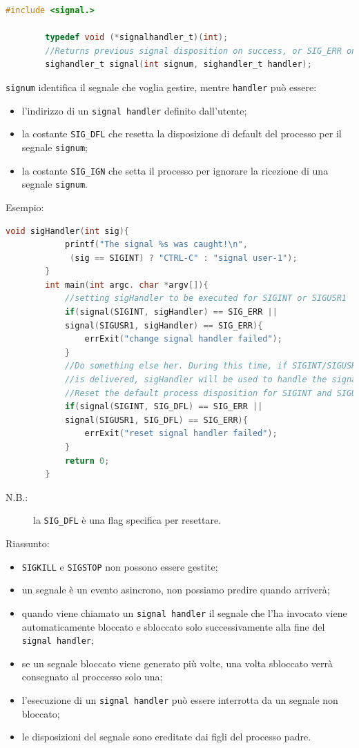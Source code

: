 \documentclass[a4paper, 12pt]{book}
\begin{document}
    \begin{lstlisting}[language=C]
        #include <signal.>

        typedef void (*signalhandler_t)(int);
        //Returns previous signal disposition on success, or SIG_ERR on error 
        sighandler_t signal(int signum, sighandler_t handler);
    \end{lstlisting}
    \verb|signum| identifica il segnale che voglia gestire, 
    mentre \verb|handler| può essere:
    \begin{itemize}
        \item l'indirizzo di un \verb|signal handler| definito dall'utente;
        \item la costante \verb|SIG_DFL| che resetta la disposizione di default del processo per il segnale \verb|signum|;
        \item la costante \verb|SIG_IGN| che setta il processo per ignorare la ricezione di una segnale \verb|signum|.
    \end{itemize}
    Esempio:
    \begin{lstlisting}[language=C]
        void sigHandler(int sig){
            printf("The signal %s was caught!\n",
             (sig == SIGINT) ? "CTRL-C" : "signal user-1");
        }
        int main(int argc. char *argv[]){
            //setting sigHandler to be executed for SIGINT or SIGUSR1
            if(signal(SIGINT, sigHandler) == SIG_ERR ||
            signal(SIGUSR1, sigHandler) == SIG_ERR){
                errExit("change signal handler failed");
            }
            //Do something else her. During this time, if SIGINT/SIGUSR1
            //is delivered, sigHandler will be used to handle the signal.
            //Reset the default process disposition for SIGINT and SIGUSR1
            if(signal(SIGINT, SIG_DFL) == SIG_ERR || 
            signal(SIGUSR1, SIG_DFL) == SIG_ERR){
                errExit("reset signal handler failed");
            }
            return 0;
        }
    \end{lstlisting}
    \begin{description}
        \item[N.B.:] la \verb|SIG_DFL| è una flag specifica per resettare.
    \end{description}
    Riassunto:
    \begin{itemize}
        \item \verb|SIGKILL| e \verb|SIGSTOP| non possono essere gestite;
        \item un segnale è un evento asincrono, non possiamo predire quando arriverà;
        \item quando viene chiamato un \verb|signal handler| il segnale che l'ha invocato viene automaticamente bloccato e sbloccato solo successivamente alla fine del \verb|signal handler|;
        \item se un segnale bloccato viene generato più volte, una volta sbloccato verrà consegnato al proccesso solo una;
        \item l'esecuzione di un \verb|signal handler| può essere interrotta da un segnale non bloccato;
        \item le disposizioni del segnale sono ereditate dai figli del processo padre.
    \end{itemize}
\end{document}
